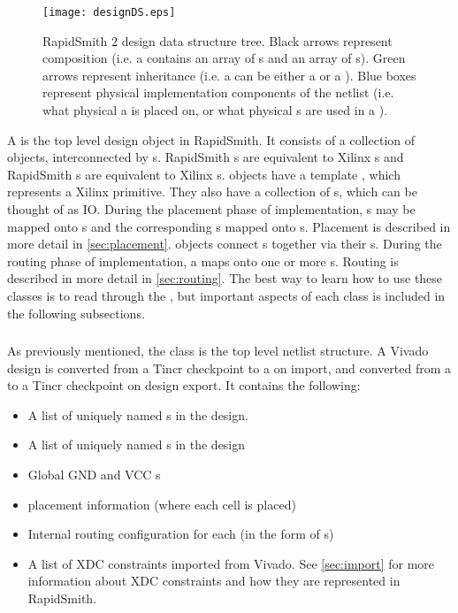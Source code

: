 \begin{figure}[H]
 \centering
 \texttt{[image: designDS.eps]}
 \caption{RapidSmith 2 design data structure tree. Black arrows represent
 composition (i.e. a  contains an array of s and
 an array of s). Green arrows represent inheritance (i.e. a
  can be either a  or a
 ). Blue boxes represent physical implementation components
 of the netlist (i.e. what physical  a  is placed on, or what
 physical s are used in a ).}
 \label{fig:designDS}
\end{figure}

\noindent
A  is the top level design object in RapidSmith. It consists of
a collection of  objects, interconnected by s. RapidSmith
s are equivalent to Xilinx s and RapidSmith s
are equivalent to Xilinx s.  objects have a template
, which represents a Xilinx primitive. They also have a
collection of s, which can be thought of as  IO. 
During the placement phase of implementation, s may be mapped onto
s and the corresponding s mapped onto s.
Placement is described in more detail in \autoref{sec:placement}. 
objects connect s together via their s.
During the routing phase of implementation, a  maps onto one or
more s. Routing is described in more detail in
\autoref{sec:routing}. The best way to learn how to use these classes is to read
through the \href{https://github.com/byuccl/RapidSmith2}{\color{blue}{Javadocs}}, but
important aspects of each class is included in the following subsections.


\subsubsection{}
As previously mentioned, the  class is the top level netlist
structure. A Vivado design is converted from a Tincr checkpoint to a
 on import, and converted from a  to a Tincr
checkpoint on design export. It contains the following:

\begin{itemize}
  \item A list of uniquely named s in the design.
  \item A list of uniquely named s in the design
  \item Global GND and VCC s
  \item {} placement information (where each cell is placed)
  \item Internal routing configuration for each   (in the
  form of  s)
  \item A list of XDC constraints imported from Vivado. See \autoref{sec:import}
  for more information about XDC constraints and how they are represented in
  RapidSmith.
\end{itemize}

